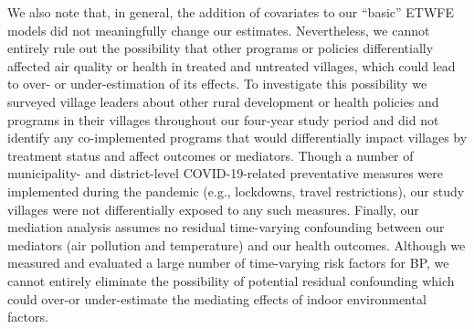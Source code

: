\documentclass[
  letterpaper,
  DIV=11,
  numbers=noendperiod]{scrartcl}
\begin{document}
We also note that, in general, the addition of covariates to our
``basic'' ETWFE models did not meaningfully change our estimates.
Nevertheless, we cannot entirely rule out the possibility that other
programs or policies differentially affected air quality or health in
treated and untreated villages, which could lead to over- or
under-estimation of its effects. To investigate this possibility we
surveyed village leaders about other rural development or health
policies and programs in their villages throughout our four-year study
period and did not identify any co-implemented programs that would
differentially impact villages by treatment status and affect outcomes
or mediators. Though a number of municipality- and
district-level COVID-19-related preventative measures were implemented
during the pandemic (e.g., lockdowns, travel restrictions), our study
villages were not differentially exposed to any such measures. Finally,
our mediation analysis assumes no residual time-varying confounding
between our mediators (air pollution and temperature) and our health
outcomes. Although we measured and evaluated a large number of
time-varying risk factors for BP, we cannot entirely eliminate the
possibility of potential residual confounding which could over-or
under-estimate the mediating effects of indoor environmental factors.
\end{document}
